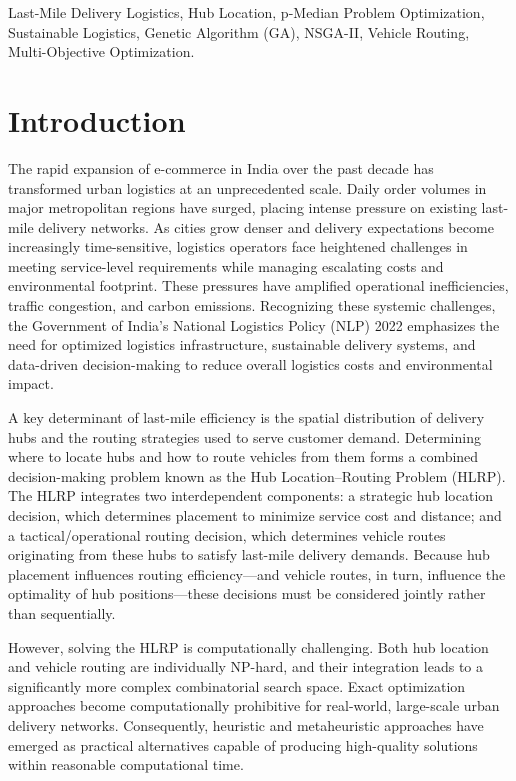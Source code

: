 \documentclass[conference]{IEEEtran}
\begin{document}
\begin{IEEEkeywords}
Last-Mile Delivery Logistics, Hub Location, p-Median Problem Optimization, Sustainable Logistics, Genetic Algorithm (GA), NSGA-II, Vehicle Routing, Multi-Objective Optimization.
\end{IEEEkeywords}

\section{Introduction}
The rapid expansion of e-commerce in India over the past decade has transformed urban logistics at an unprecedented scale. Daily order volumes in major metropolitan regions have surged, placing intense pressure on existing last-mile delivery networks. As cities grow denser and delivery expectations become increasingly time-sensitive, logistics operators face heightened challenges in meeting service-level requirements while managing escalating costs and environmental footprint. These pressures have amplified operational inefficiencies, traffic congestion, and carbon emissions. Recognizing these systemic challenges, the Government of India's National Logistics Policy (NLP) 2022 emphasizes the need for optimized logistics infrastructure, sustainable delivery systems, and data-driven decision-making to reduce overall logistics costs and environmental impact.

A key determinant of last-mile efficiency is the spatial distribution of delivery hubs and the routing strategies used to serve customer demand. Determining where to locate hubs and how to route vehicles from them forms a combined decision-making problem known as the Hub Location–Routing Problem (HLRP). The HLRP integrates two interdependent components: a strategic hub location decision, which determines placement to minimize service cost and distance; and a tactical/operational routing decision, which determines vehicle routes originating from these hubs to satisfy last-mile delivery demands. Because hub placement influences routing efficiency—and vehicle routes, in turn, influence the optimality of hub positions—these decisions must be considered jointly rather than sequentially.

However, solving the HLRP is computationally challenging. Both hub location and vehicle routing are individually NP-hard, and their integration leads to a significantly more complex combinatorial search space. Exact optimization approaches become computationally prohibitive for real-world, large-scale urban delivery networks. Consequently, heuristic and metaheuristic approaches have emerged as practical alternatives capable of producing high-quality solutions within reasonable computational time.
\end{document}
